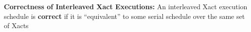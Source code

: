 \documentclass[10pt,landscape]{article}
\makeatletter
\newcommand{\subsubsubsection}{\@startsection{subsubsection}{3}{0mm}%
                                {-1ex plus -.5ex minus -.2ex}%
                                {1ex plus .2ex}%
                                {\normalfont\scriptsize\bfseries}}
\newcommand{\1}{\mathmybb{1}}
\makeatother
\begin{document}
\begin{multicols*}{3}

\textbf{Correctness of Interleaved Xact Executions:} An interleaved Xact execution schedule is \textbf{correct} if it is ``equivalent'' to some serial schedule over the same set of Xacts



\end{multicols*}
\end{document}
